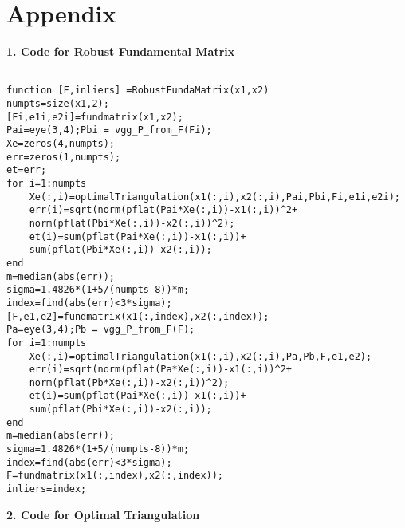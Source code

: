 \chapter{Appendix}

\textbf{1. Code for Robust Fundamental Matrix}
\begin{lstlisting}

function [F,inliers] =RobustFundaMatrix(x1,x2)
numpts=size(x1,2);
[Fi,e1i,e2i]=fundmatrix(x1,x2);
Pai=eye(3,4);Pbi = vgg_P_from_F(Fi);
Xe=zeros(4,numpts);
err=zeros(1,numpts);
et=err;
for i=1:numpts
    Xe(:,i)=optimalTriangulation(x1(:,i),x2(:,i),Pai,Pbi,Fi,e1i,e2i);
    err(i)=sqrt(norm(pflat(Pai*Xe(:,i))-x1(:,i))^2+
    norm(pflat(Pbi*Xe(:,i))-x2(:,i))^2);
    et(i)=sum(pflat(Pai*Xe(:,i))-x1(:,i))+
    sum(pflat(Pbi*Xe(:,i))-x2(:,i));
end
m=median(abs(err));
sigma=1.4826*(1+5/(numpts-8))*m;
index=find(abs(err)<3*sigma);
[F,e1,e2]=fundmatrix(x1(:,index),x2(:,index));
Pa=eye(3,4);Pb = vgg_P_from_F(F);
for i=1:numpts
    Xe(:,i)=optimalTriangulation(x1(:,i),x2(:,i),Pa,Pb,F,e1,e2);        
    err(i)=sqrt(norm(pflat(Pa*Xe(:,i))-x1(:,i))^2+
    norm(pflat(Pb*Xe(:,i))-x2(:,i))^2);
    et(i)=sum(pflat(Pai*Xe(:,i))-x1(:,i))+
    sum(pflat(Pbi*Xe(:,i))-x2(:,i));
end
m=median(abs(err));
sigma=1.4826*(1+5/(numpts-8))*m;
index=find(abs(err)<3*sigma);
F=fundmatrix(x1(:,index),x2(:,index));
inliers=index;

\end{lstlisting}
\textbf{2. Code for Optimal Triangulation}

